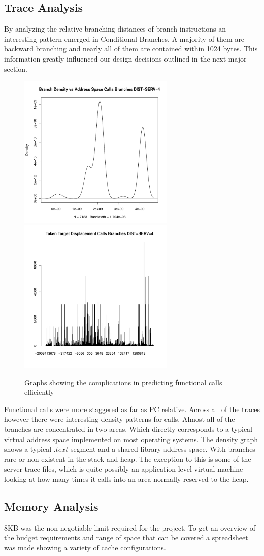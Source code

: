 \subsection{Trace Analysis}
By analyzing the relative branching distances of branch instructions an interesting pattern emerged in Conditional Branches. A majority of them are backward branching and nearly all of them are contained within 1024 bytes. This information greatly influenced our design decisions outlined in the next major section.
\begin{figure}
\begin{center} 
\includegraphics[width=7.4cm]{"./Calls Branches DIST-SERV-4-density"}
\includegraphics[width=7.4cm]{"./Calls Branches DIST-SERV-4-histogram"}
\caption{Graphs showing the complications in predicting functional calls efficiently}
\end{center}
\end{figure}
Functional calls were more staggered as far as PC relative. Across all of the traces however there were interesting density patterns for calls. Almost all of the branches are concentrated in two areas. Which directly corresponds to a typical virtual address space implemented on most operating systems. The density graph shows a typical $.text$ segment and a shared library address space. With branches rare or non existent in the stack and heap. The exception to this is some of the server trace files, which is quite possibly an application level virtual machine looking at how many times it calls into an area normally reserved to the heap.

\subsection{Memory Analysis}
8KB was the non-negotiable limit required for the project. To get an overview of the budget requirements and range of space that can be covered a spreadsheet was made showing a variety of cache configurations.
